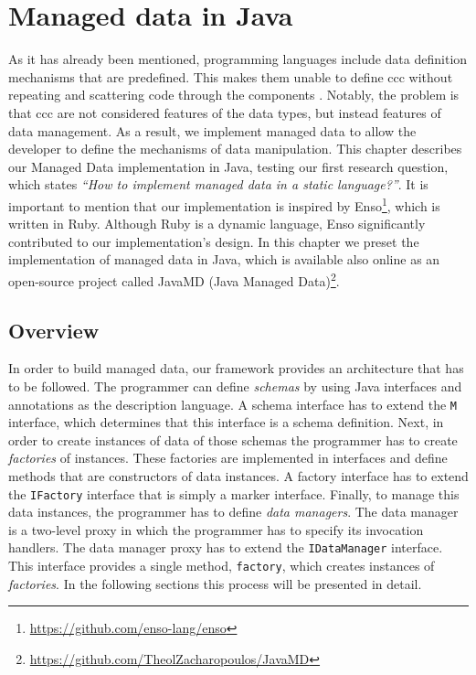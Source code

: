 
\chapter{Managed data in Java}\label{Implementation}

As it has already been mentioned, programming languages include data definition mechanisms that are predefined. 
This makes them unable to define \ac{ccc} without repeating and scattering code through the components \cite{loh2012managed}.
Notably, the problem is that \ac{ccc} are not considered features of the data types, but instead features of data management.
As a result, we implement managed data to allow the developer to define the mechanisms of data manipulation.
This chapter describes our Managed Data implementation in Java, testing our first research question, which states \textit{``How to implement managed data in a static language?''}.
It is important to mention that our implementation is inspired by Enso\footnote{\url{https://github.com/enso-lang/enso}}, which is written in Ruby.
Although Ruby is a dynamic language, Enso significantly contributed to our implementation's design.
In this chapter we preset the implementation of managed data in Java, which is available also online as an open-source project called JavaMD (Java Managed Data)\footnote{\url{https://github.com/TheolZacharopoulos/JavaMD}}.

\section{Overview}\label{sec:Overview}
In order to build managed data, our framework provides an architecture that has to be followed.
The programmer can define \textit{schemas} by using Java interfaces and annotations as the description language.
A schema interface has to extend the \texttt{M} interface, which determines that this interface is a schema definition.
Next, in order to create instances of data of those schemas the programmer has to create \textit{factories} of instances.
These factories are implemented in interfaces and define methods that are constructors of data instances.
A factory interface has to extend the \texttt{IFactory} interface that is simply a marker interface.
Finally, to manage this data instances, the programmer has to define \textit{data managers}.
The data manager is a two-level proxy in which the programmer has to specify its invocation handlers.
The data manager proxy has to extend the \texttt{IDataManager} interface.
This interface provides a single method, \texttt{factory}, which creates instances of \textit{factories}.
In the following sections this process will be presented in detail.

